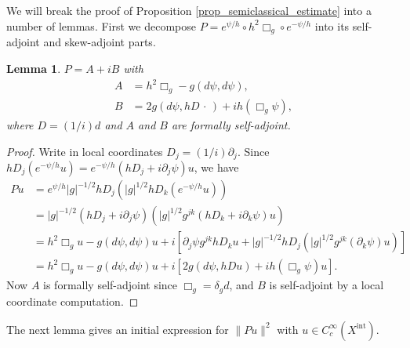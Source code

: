 \documentclass[11pt,letterpaper]{amsart}
\newtheorem{Lemma}[Theorem]{Lemma}
\theoremstyle{definition}
\numberwithin{equation}{section}
\newcommand{\norm}[1]{\lVert #1 \rVert}         %
\newcommand{\p}{\partial}
\def\p{\partial}
\begin{document}
We will break the proof of Proposition \ref{prop_semiclassical_estimate} into a number of lemmas. First we decompose $P = e^{\psi/h} \circ h^2 \Box_g \circ e^{-\psi/h}$ into its self-adjoint and skew-adjoint parts.

\begin{Lemma} \label{lemma_p_decomposition_a_ib}
$P = A + i B$ with 
\begin{align*}
A &= h^2 \Box_g - g(d\psi, d\psi), \\
B &= 2 g(d\psi, hD\,\cdot\,) + i h (\Box_g \psi),
\end{align*}
where $D = (1/i) d$ and $A$ and $B$ are formally self-adjoint.
\end{Lemma}
\begin{proof}
Write in local coordinates $D_j = (1/i) \p_j$. Since $h D_j(e^{-\psi/h} u) = e^{-\psi/h}(h D_j + i \p_j \psi) u$, we have 
\begin{align*}
Pu &= e^{\psi/h} |g|^{-1/2} hD_j(|g|^{1/2} hD_k (e^{-\psi/h} u)) \\
 &= |g|^{-1/2} (hD_j + i \p_j \psi)(|g|^{1/2} g^{jk} (hD_k + i \p_k \psi) u ) \\
 &= h^2 \Box_g u - g(d\psi, d\psi) u + i \left[ \p_j \psi g^{jk} hD_k u + |g|^{-1/2} h D_j (|g|^{1/2} g^{jk} (\p_k \psi) u) \right] \\
 &= h^2 \Box_g u - g(d\psi, d\psi) u + i \left[ 2 g(d\psi, hD u) + ih (\Box_g \psi) u \right].
\end{align*}
Now $A$ is formally self-adjoint since $\Box_g = \delta_g d$, and $B$ is self-adjoint by a local coordinate computation.
\end{proof}

The next lemma gives an initial expression for $\norm{Pu}^2$ with $u \in C^{\infty}_c(X^{\mathrm{int}})$.
\end{document}

